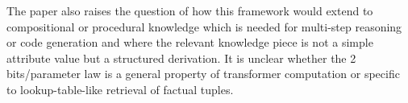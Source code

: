 \documentclass{article}
\begin{document}
\begin{itemize}[leftmargin=*]
  The paper also raises the question of how this framework would extend to compositional or procedural knowledge which is needed for multi-step reasoning or code generation and where the relevant knowledge piece is not a simple attribute value but a structured derivation. It is unclear whether the 2 bits/parameter law is a general property of transformer computation or specific to lookup-table-like retrieval of factual tuples.

\end{itemize}



\end{document}

